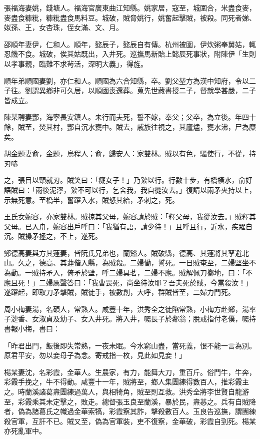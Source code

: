 \begin{pinyinscope}
張福海妻姚，錢塘人。福海官廣東曲江知縣。姚家居，寇至，城圍合，米盡食麥，麥盡食糠粃，糠粃盡食馬料豆。城破，賊脅姚行，姚奮起擊賊，被殺。同死者娣、姒孫、王，女杏珠，侄女滿、文、月。

邵順年妻伊，仁和人。順年，懿辰子，懿辰自有傳。杭州被圍，伊炊粥奉舅姑，輒忍饑不食。城破，俟其姑既出，入井死。巡撫馬新貽上懿辰死事狀，附陳伊「生則以孝事親，臨難不求茍活，深明大義」，得旌。

順年弟順國妻劉，亦仁和人。順國為六合知縣，卒。劉父堃方為漢中知府，令以二子往。劉謂異鄉非可久居，以順國喪還葬。蒐先世藏書授二子，督就學甚嚴，二子皆成立。

陳某聘妻酆，海寧長安鎮人。未行而夫死，誓不嫁，奉父；父卒，為立後。年四十餘，賊至，焚其村，酆自沉水甕中。賊去，戚族往視之，其廬燼，甕水沸，尸為糜矣。

胡金題妻俞，金題，烏程人；俞，歸安人：家雙林。賊以有色，驅使行，不從，持刃哧

之，張目以頸就刃。賊笑曰：「癡女子！」乃縶以行。行數十步，有橋橫水，俞好語賊曰：「雨後泥濘，縶不可以行，乞舍我，我自從汝去。」復請以兩矛夾持以上，示無死意。至橋半，奮躍入水，賊怒其紿，矛刺之，死。

王氏女婉容，亦家雙林。賊掠其父母，婉容請於賊：「釋父母，我從汝去。」賊釋其父母。已入舟，婉容出戶呼曰：「我猶有語，請少待！」且呼且行，近水，疾躍自沉。賊操矛拯之，不上，遂死。

鄭德高妻與方其蓮妻，皆阮氏兄弟也，蘭谿人。賊破縣，德高、其蓮將其孥避北山。久之，德高、其蓮偕入縣，為賊殺。二婦慟，誓死。一日賊奄至，二婦堅坐不為動。一賊持矛入，倚矛於壁，呼二婦具茗，二婦不應。賊解佩刀擲地，曰：「不應且死！」二婦厲聲答曰：「我曹畏死，尚坐待汝耶？吾夫死於賊，今當殺汝！」遂躍起，即取刀矛擊賊，賊徒手，被數創，大呼，群賊皆至，二婦力鬥死。

周小梅妻湯，名碩人，常熟人。咸豐十年，洪秀全之徒陷常熟，小梅方赴鄉，湯率子漣香、女淑貞及幼子、女入井死。將入井，囑長子於鄰翁；脫戒指付老僕，囑持書報小梅，書曰：

「昨君出門，飯後即失常熟，一夜未眠。今水窮山盡，當死義，恨不能一言為別。原君平安，勿以妾母子為念。寄戒指一枚，見此如見妾！」

楊某妻沈，名彩霞，金華人。生農家，有力，能舞大刀，重百斤。俗鬥牛，牛奔，彩霞手挽之，牛不得動。咸豐十一年，賊將至，鄉人集團練得數百人，推彩霞主之。時蘭溪諸葛燾團練過萬人，與相犄角，賊至則互救。洪秀全將李世賢自龍游至，彩霞乘其未定擊之，敗走。總督張玉良至蘭溪，暴於民，燾惎之。兵有自賊降者，偽為諸葛氏之幟過金華索犒，彩霞察其詐，擊殺數百人。玉良告巡撫，謂團練殺官軍，互訐不已。賊又至，偽為官軍裝，吏不復察，金華破，彩霞自剄死。楊某亦死亂軍中。


\end{pinyinscope}
